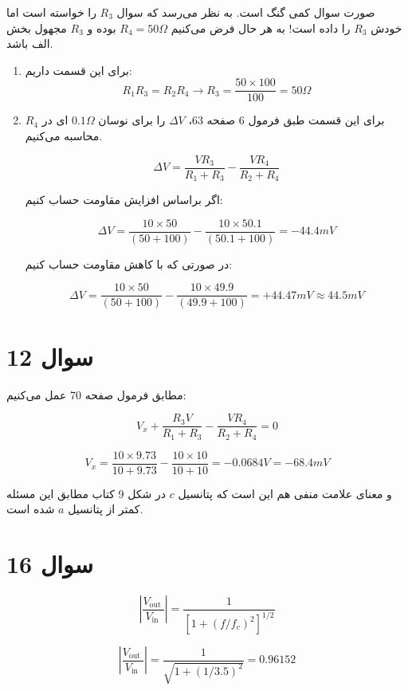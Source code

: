 \documentclass[12pt]{article}
\begin{document}
صورت سوال کمی گنگ است. به نظر می‌رسد که سوال $R_3$ را خواسته است اما خودش $R_3$ را داده است! به هر حال فرض می‌کنیم $R_4 = 50\Omega$ بوده و $R_3$ مجهول بخش الف باشد.

\begin{enumerate}[label = \harfi*)]
	\item 
	برای این قسمت داریم:
	$$R_1 R_3 = R_2 R_4 \rightarrow R_3 = \frac{50 \times 100}{100} = 50 \Omega$$
	
	\item
	
	برای این قسمت طبق فرمول $6$ صفحه $63$، 
	$\Delta V$
	را برای نوسان $0.1 \Omega$ ای در $R_4$ محاسبه می‌کنیم.
	
	
	$$
	\Delta V=\frac{V R_{3}}{R_{1}+R_{3}}-\frac{V R_{4}}{R_{2}+R_{4}}
	$$
	
	اگر براساس افزایش مقاومت حساب کنیم:
	
	$$\Delta V = \frac{10 \times 50}{(50 + 100)} - \frac{10 \times 50.1}{(50.1 + 100)} = -44.4 mV$$
	
	در صورتی که با کاهش مقاومت حساب کنیم:
	
		$$\Delta V = \frac{10 \times 50}{(50 + 100)} - \frac{10 \times 49.9}{(49.9 + 100)} = +44.47 mV \approx 44.5 mV$$
		
		
\end{enumerate}

\newpage

\section*{سوال 12}

مطابق فرمول صفحه 70 عمل می‌کنیم:

$$
V_{x}+\frac{R_{3} V}{R_{1}+R_{3}}-\frac{V R_{4}}{R_{2}+R_{4}}=0
$$

$$V_{x} = \frac{10 \times 9.73}{10+9.73} - \frac{10 \times 10}{10+10} = -0.0684 V = -68.4 mV$$


و معنای علامت منفی‌ هم این است که پتانسیل $c$ در شکل 9 کتاب مطابق این مسئله کمتر از پتانسیل $a$ شده است.

\newpage

\section*{سوال 16}

$$
\left|\frac{V_{\text {out }}}{V_{\text {in }}}\right|=\frac{1}{\left[1+\left(f / f_{c}\right)^{2}\right]^{1 / 2}}
$$

$$\left|\frac{V_{\text {out }}}{V_{\text {in }}}\right| = \frac{1}{\sqrt{1 + (1/3.5)^2}} = 0.96152$$
\end{document}
